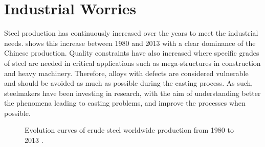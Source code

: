 \section{Industrial Worries}
Steel production has continuously increased over the years to meet the industrial needs.  shows this increase between 1980 and 2013 with a 
clear dominance of the Chinese production. Quality constraints have also increased where specific grades of steel are needed in critical applications such as mega-structures
in construction and  heavy machinery. Therefore, alloys with defects are considered vulnerable and should be avoided as much as possible during the casting process. As such, steelmakers have been investing
in research, with the aim of understanding better the phenomena leading to casting problems, and improve the processes when possible.
\begin{figure}[htbp]
\centering
{}
\caption{Evolution curves of crude steel worldwide production from 1980 to 2013 \citep{wsa_world_2014}.}
\label{fig:steel_production}
\end{figure}

